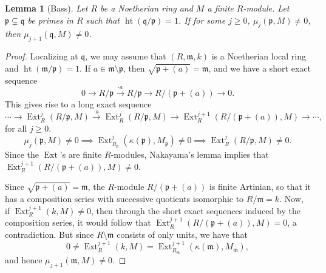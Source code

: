 \documentclass[10pt]{article}
\theoremstyle{thmstyle}
\newtheorem{lemma}[theorem]{Lemma}
\theoremstyle{defstyle}
\newcommand{\frakm}{\mathfrak{m}} %
\newcommand{\frakp}{\mathfrak{p}} %
\newcommand{\frakq}{\mathfrak{q}} %
\renewcommand{\ge}{\geqslant}
\newcommand{\Ext}{\operatorname{Ext}}
\newcommand{\hght}{\operatorname{ht}}
\begin{document}
\begin{lemma}[Bass]
    Let $R$ be a Noetherian ring and $M$ a finite $R$-module. Let $\frakp\subsetneq\frakq$ be primes in $R$ such that $\hght(\frakq/\frakp) = 1$. If for some $j\ge 0$, $\mu_j(\frakp, M)\ne 0$, then $\mu_{j + 1}(\frakq, M)\ne 0$.
\end{lemma}
\begin{proof}
    Localizing at $\frakq$, we may assume that $(R,\frakm, k)$ is a Noetherian local ring and $\hght(\frakm/\frakp) = 1$. If $a\in\frakm\setminus\frakp$, then $\sqrt{\frakp + (a)} = \frakm$, and we have a short exact sequence 
    \begin{equation*}
        0\to R/\frakp\xrightarrow{\cdot a} R/\frakp\to R/(\frakp + (a)) \to 0.
    \end{equation*}
    This gives rise to a long exact sequence 
    \begin{equation*}
        \cdots\to \Ext^j_R(R/\frakp, M)\xrightarrow{\cdot a}\Ext^j_R(R/\frakp, M)\to\Ext^{j + 1}_R(R/(\frakp + (a)), M)\to\cdots,
    \end{equation*}
    for all $j\ge 0$.
    \begin{equation*}
        \mu_j(\frakp, M)\ne 0\implies\Ext^j_{R_\frakp}\left(\kappa(\frakp), M_\frakp\right)\ne 0\implies \Ext^j_R(R/\frakp, M)\ne 0.
    \end{equation*}
    Since the $\Ext$'s are finite $R$-modules, Nakayama's lemma implies that $\Ext^{j + 1}_R(R/(\frakp + (a)), M)\ne 0$. 
    
    Since $\sqrt{\frakp + (a)} = \frakm$, the $R$-module $R/(\frakp + (a))$ is finite Artinian, so that it has a composition series with successive quotients isomorphic to $R/\frakm = k$. Now, if $\Ext^{j + 1}_R(k, M)\ne 0$, then through the short exact sequences induced by the composition series, it would follow that $\Ext^{j + 1}_R(R/(\frakp + (a)), M) = 0$, a contradiction. But since $R\setminus\frakm$ consists of only units, we have that 
    \begin{equation*}
        0\ne\Ext^{j + 1}_R(k, M) = \Ext^{j + 1}_{R_\frakm}(\kappa(\frakm), M_\frakm),
    \end{equation*}
    and hence $\mu_{j + 1}(\frakm, M)\ne 0$.
\end{proof}
\end{document}
